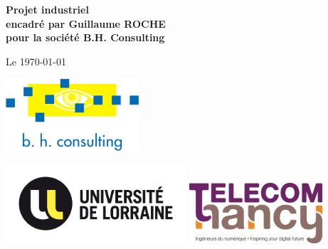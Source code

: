 \documentclass[10pt]{article}
\begin{document}
\begin{center}
	{\Huge\textbf{\titreA}}

	\vspace{1cm}

	{\huge\emph{\titreB}}

	\vspace{1cm}

	{\large\textbf{Projet industriel\\ encadré par Guillaume ROCHE\\ pour la société B.H. Consulting}}

	\vspace{1cm}
	{\large Le \today}

	\vspace{1.5cm}

	\includegraphics[width=140pt]{img/BHConsulting.jpg}

	\vspace{1.5cm}

	\includegraphics[width=190pt]{img/ul.png}
	\hspace{3.5cm}
	\includegraphics[width=140pt]{img/telecom-nancy.jpg}
\end{center}
\newpage

\thispagestyle{empty}
\tableofcontents
\newpage
\end{document}
